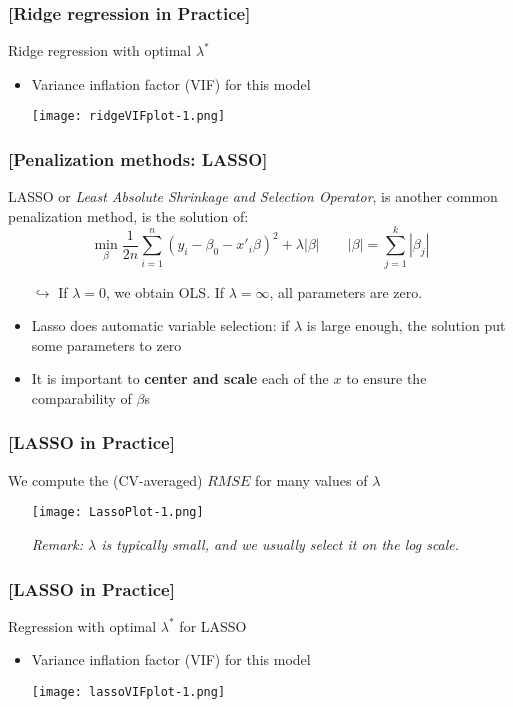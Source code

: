 \documentclass[xcolor=x11names,compress, handhouts]{beamer}
\renewcommand{\(}{\begin{columns}}
\renewcommand{\)}{\end{columns}}
\newcommand{\<}[1]{\begin{column}{#1}}
\renewcommand{\>}{\end{column}}
\begin{document}
\begin{frame} %
\frametitle{\textcolor{brique}{[Ridge regression in Practice]}}
Ridge regression with  optimal $\lambda^*$
\pause
\begin{itemize}[<+->]
\item Variance inflation factor (VIF)  for this model
\item[] \texttt{[image: ridgeVIFplot-1.png]}
\end{itemize}
\end{frame}


\begin{frame} %
\frametitle{\textcolor{brique}{[Penalization methods: LASSO]}}
LASSO or \textit{Least Absolute Shrinkage and Selection Operator}, is another common penalization method,
 is  the solution of:
$$
\min_{\beta} \frac{1}{2n}
\sum_{i=1}^{n}{ \left( y_i - \beta_0 - x'_i\beta\right)^{2} } +
\lambda |\beta|
\qquad
|\beta| = \sum_{j=1}^k |\beta_j|
$$
\pause
\begin{itemize}[<+->]
\item[$\hookrightarrow$] If $\lambda  = 0$, we obtain OLS. If $\lambda = \infty$, all
  parameters are zero.
\item Lasso does automatic variable selection: if $\lambda$ is large enough, the solution put some parameters to zero
\item It is important to \textbf{center and scale}  each of the $x$ to ensure the comparability of $\beta$s
\end{itemize}
\end{frame}

\begin{frame} %
\frametitle{\textcolor{brique}{[LASSO in Practice]}}
We compute the (CV-averaged) $RMSE$ for many values of $\lambda$
\pause
\begin{itemize}[<+->]
\item[]  \texttt{[image: LassoPlot-1.png]}
\item[]\textit{Remark: $\lambda$ is typically small, and we usually select it on the log scale.}
\end{itemize}
\end{frame}

\begin{frame} %
\frametitle{\textcolor{brique}{[LASSO in Practice]}}
Regression with  optimal $\lambda^*$ for LASSO
\pause
\begin{itemize}[<+->]
\item Variance inflation factor (VIF)  for this model
\item[] \texttt{[image: lassoVIFplot-1.png]}
\end{itemize}
\end{frame}
\end{document}
